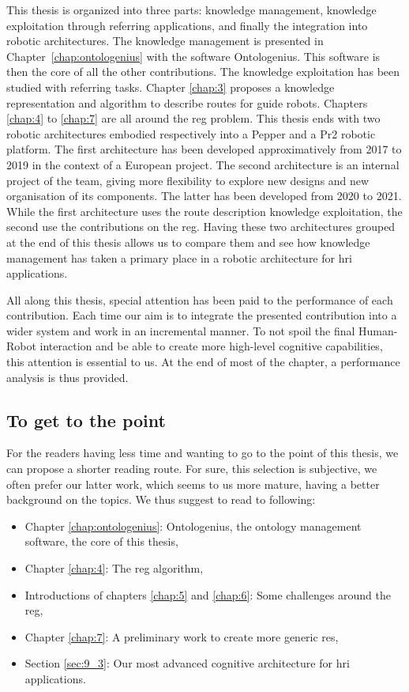This thesis is organized into three parts: knowledge management, knowledge exploitation through referring applications, and finally the integration into robotic architectures. The knowledge management is presented in Chapter~\ref{chap:ontologenius} with the software Ontologenius. This software is then the core of all the other contributions. The knowledge exploitation has been studied with referring tasks. Chapter \ref{chap:3} proposes a knowledge representation and algorithm to describe routes for guide robots. Chapters \ref{chap:4} to \ref{chap:7} are all around the \acrlong{reg} problem. This thesis ends with two robotic architectures embodied respectively into a Pepper and a Pr2 robotic platform. The first architecture has been developed approximatively from 2017 to 2019 in the context of a European project. The second architecture is an internal project of the team, giving more flexibility to explore new designs and new organisation of its components. The latter has been developed from 2020 to 2021. While the first architecture uses the route description knowledge exploitation, the second use the contributions on the \acrlong{reg}. Having these two architectures grouped at the end of this thesis allows us to compare them and see how knowledge management has taken a primary place in a robotic architecture for \acrlong{hri} applications.

All along this thesis, special attention has been paid to the performance of each contribution. Each time our aim is to integrate the presented contribution into a wider system and work in an incremental manner. To not spoil the final Human-Robot interaction and be able to create more high-level cognitive capabilities, this attention is essential to us. At the end of most of the chapter, a performance analysis is thus provided.

\subsection*{To get to the point}

For the readers having less time and wanting to go to the point of this thesis, we can propose a shorter reading route. For sure, this selection is subjective, we often prefer our latter work, which seems to us more mature, having a better background on the topics. We thus suggest to read to following:

\begin{itemize}
  \item Chapter \ref{chap:ontologenius}: Ontologenius, the ontology management software, the core of this thesis,
  \item Chapter \ref{chap:4}: The \acrlong{reg} algorithm,
  \item Introductions of chapters \ref{chap:5} and \ref{chap:6}: Some challenges around the \acrlong{reg},
  \item Chapter \ref{chap:7}: A preliminary work to create more generic \acrlong{re}s,
  \item Section \ref{sec:9_3}: Our most advanced cognitive architecture for \acrlong{hri} applications.
\end{itemize}

